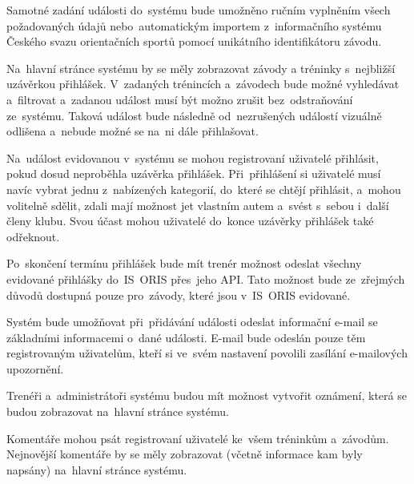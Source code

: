 \begin{enumerate}[label=\textcolor{decoration}{\textbf{F\arabic*}}, leftmargin=6mm]
	Samotné zadání události do~systému bude umožněno ručním vyplněním všech požadovaných údajů nebo~automatickým importem z~informačního systému Českého svazu orientačních sportů pomocí unikátního identifikátoru závodu.

	Na~hlavní stránce systému by se měly zobrazovat závody a tréninky s~nejbližší uzávěrkou přihlášek. V~zadaných trénincích a~závodech bude možné vyhledávat a~filtrovat a~zadanou událost musí být možno zrušit bez~odstraňování ze~systému. Taková událost bude následně od~nezrušených událostí vizuálně odlišena a~nebude možné se na~ni dále přihlašovat.

	Na~událost evidovanou v~systému se mohou registrovaní uživatelé přihlásit, pokud dosud neproběhla uzávěrka přihlášek. Při~přihlášení si uživatelé musí navíc vybrat jednu z~nabízených kategorií, do~které se chtějí přihlásit, a~mohou volitelně sdělit, zdali mají možnost jet vlastním autem a~svést s~sebou i~další členy klubu. Svou účast mohou uživatelé do~konce uzávěrky přihlášek také odřeknout.

	Po~skončení termínu přihlášek bude mít trenér možnost odeslat všechny evidované přihlášky do~IS~ORIS přes~jeho API. Tato možnost bude ze~zřejmých důvodů dostupná pouze pro~závody, které jsou v~IS~ORIS evidované.

	Systém bude umožňovat při~přidávání události odeslat informační e-mail se základními informacemi o~dané události. E-mail bude odeslán pouze těm registrovaným uživatelům, kteří si ve~svém nastavení povolili zasílání e-mailových upozornění.

	Trenéři a~administrátoři systému budou mít možnost vytvořit oznámení, která se budou zobrazovat na~hlavní stránce systému.

	Komentáře mohou psát registrovaní uživatelé ke~všem tréninkům a~závodům. Nejnovější komentáře by se měly zobrazovat (včetně informace kam byly napsány) na~hlavní stránce systému.
\end{enumerate}

